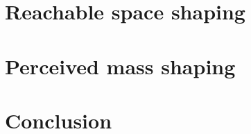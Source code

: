 \section{Reachable space shaping}
\label{ch:human_robot_reachable_space}


\section{Perceived mass shaping}
\label{ch:human_robot_percieved_mass}

\section{Conclusion}

